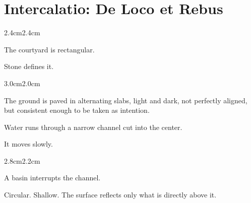 
\chapter*{Intercalatio: De Loco et Rebus}


\begin{adjustwidth}{2.4cm}{2.4cm}

The courtyard is rectangular.

\vspace{1em}

Stone defines it.

\vspace{2em}

\end{adjustwidth}

\begin{adjustwidth}{3.0cm}{2.0cm}

The ground is paved in alternating slabs, light and dark, not perfectly aligned,
but consistent enough to be taken as intention.

\vspace{1em}

Water runs through a narrow channel cut into the center.

\vspace{1em}

It moves slowly.

\vspace{2em}

\end{adjustwidth}

\begin{adjustwidth}{2.8cm}{2.2cm}

A basin interrupts the channel.

\vspace{1em}

Circular. Shallow. The surface reflects only what is directly above it.

\vspace{2em}

\end{adjustwidth}

